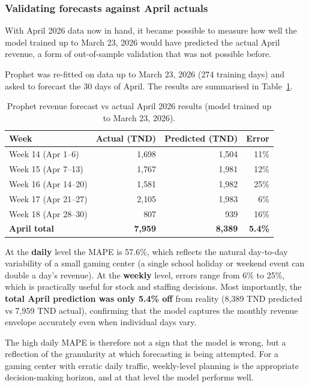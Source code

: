 \documentclass[12pt, a4paper]{report}
\begin{document}
\subsubsection*{Validating forecasts against April actuals}

With April 2026 data now in hand, it became possible to measure how well the
model trained up to March 23, 2026 would have predicted the actual April
revenue, a form of out-of-sample validation that was not possible before.

Prophet was re-fitted on data up to March 23, 2026 (274 training days) and
asked to forecast the 30 days of April. The results are summarised in
Table~\ref{tab:april_validation}.

\begin{table}[H]
  \centering
  \caption{Prophet revenue forecast vs actual April 2026 results (model trained
           up to March 23, 2026).\label{tab:april_validation}}
  \begin{tabular}{lrrr}
    \toprule
    \textbf{Week} & \textbf{Actual (TND)} & \textbf{Predicted (TND)} & \textbf{Error} \\
    \midrule
    Week 14 (Apr 1--6)   & 1{,}698 & 1{,}504 & 11\% \\
    Week 15 (Apr 7--13)  & 1{,}767 & 1{,}981 & 12\% \\
    Week 16 (Apr 14--20) & 1{,}581 & 1{,}982 & 25\% \\
    Week 17 (Apr 21--27) & 2{,}105 & 1{,}983 &  6\% \\
    Week 18 (Apr 28--30) &   807   &   939   & 16\% \\
    \midrule
    \textbf{April total} & \textbf{7{,}959} & \textbf{8{,}389} & \textbf{5.4\%} \\
    \bottomrule
  \end{tabular}
\end{table}

At the \textbf{daily} level the MAPE is 57.6\%, which reflects the natural
day-to-day variability of a small gaming center (a single school holiday or
weekend event can double a day's revenue). At the \textbf{weekly} level,
errors range from 6\% to 25\%, which is practically useful for stock and
staffing decisions. Most importantly, the \textbf{total April prediction was
only 5.4\% off} from reality (8{,}389 TND predicted vs 7{,}959 TND actual),
confirming that the model captures the monthly revenue envelope accurately
even when individual days vary.

The high daily MAPE is therefore not a sign that the model is wrong, but a
reflection of the granularity at which forecasting is being attempted.
For a gaming center with erratic daily traffic, weekly-level planning is the
appropriate decision-making horizon, and at that level the model performs well.
\end{document}
